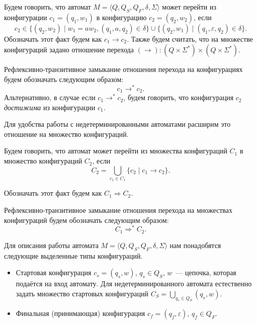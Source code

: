 \begin{definition}
    Будем говорить, что автомат $M = \langle Q, Q_S, Q_F, \delta, \Sigma \rangle$ может перейти из конфигурации $c_1 = (q_1, w_1)$ в конфигурацию $c_2 = (q_2, w_2)$, если
    \[
    c_2 \in \{(q_2,w_2) \mid w_1 = aw_2, (q_1,a, q_2) \in \delta\} \cup \{(q_2,w_1) \mid (q_1, \varepsilon, q_2) \in \delta\}.
    \]
    Обозначать этот факт будем как $c_1 \to c_2$.
    Также будем считать, что на множестве конфигураций задано отношение перехода $(\to):(Q \times \Sigma^*)\times(Q \times \Sigma^*)$.

\end{definition}


\begin{definition}
    Рефлексивно-транзитивное замыкание отношения перехода на конфигурациях будем обозначать следующим образом: \[ c_1 \to^* c_2. \]
    Альтернативно, в случае если $c_1 \to^* c_2$, будем говорить, что конфигурация $c_2$ \textit{достижима} из конфигурации $c_1$.
\end{definition}

Для удобства работы с недетерминированными автоматами расширим это отношение на множество конфигураций.

\begin{definition}
Будем говорить, что автомат может перейти из множества конфигураций $C_1$ в множество конфигураций $C_2$, если
\[
C_2 = \bigcup_{c_1 \in C_1} \{c_2 \mid c_1 \to c_2 \}.
\]

Обозначать этот факт будем как  $C_1 \Rightarrow C_2 $.
\end{definition}

\begin{definition}
Рефлексивно-транзитивное замыкание отношения перехода на множествах конфигураций будем обозначать следующим образом: \[ C_1 \Rightarrow^* C_2. \]
\end{definition}

Для описания работы автомата $M = \langle Q, Q_S, Q_F, \delta, \Sigma \rangle$ нам понадобятся следующие выделенные типы конфигураций.
\begin{itemize}
    \item Стартовая конфигурация $c_s = (q_s,w)$, $q_s \in Q_S$, $w$~--- цепочка, которая подаётся на вход автомату.
    Для недетерминированного автомата естественно задать множество стартовых конфигураций $C_S = \bigcup_{q_s \in Q_S} (q_s,w)$.
    \item Финальная (принимающая) конфигурация $c_f = (q_f,\varepsilon)$, $q_f \in Q_F$.
\end{itemize}

